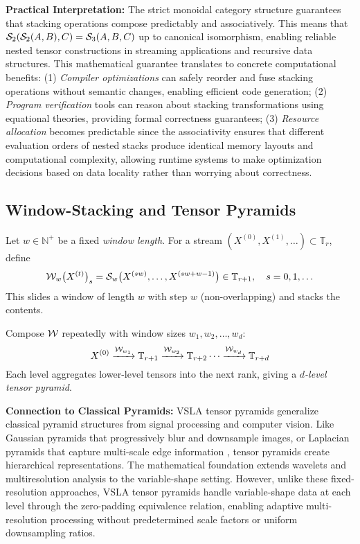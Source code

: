 \textbf{Practical Interpretation:} The strict monoidal category structure guarantees that stacking operations compose predictably and associatively. This means that $\mathcal{S}_2(\mathcal{S}_2(A,B),C) = \mathcal{S}_3(A,B,C)$ up to canonical isomorphism, enabling reliable nested tensor constructions in streaming applications and recursive data structures. This mathematical guarantee translates to concrete computational benefits: (1) \textit{Compiler optimizations} can safely reorder and fuse stacking operations without semantic changes, enabling efficient code generation; (2) \textit{Program verification} tools can reason about stacking transformations using equational theories, providing formal correctness guarantees; (3) \textit{Resource allocation} becomes predictable since the associativity ensures that different evaluation orders of nested stacks produce identical memory layouts and computational complexity, allowing runtime systems to make optimization decisions based on data locality rather than worrying about correctness.

\subsection{Window-Stacking and Tensor Pyramids}

\begin{definition}
Let $w \in \mathbb{N}^+$ be a fixed \emph{window length}. For a stream $(X^{(0)}, X^{(1)}, \ldots) \subset \mathbb{T}_r$, define
\[
\mathcal{W}_w\bigl(X^{(t)}\bigr)_s = \mathcal{S}_w\bigl(X^{(sw)}, \ldots, X^{(sw+w-1)}\bigr) \in \mathbb{T}_{r+1}, \quad s = 0, 1, \ldots
\]
This slides a window of length $w$ with step $w$ (non-overlapping) and stacks the contents.
\end{definition}

\begin{definition}
Compose $\mathcal{W}$ repeatedly with window sizes $w_1, w_2, \ldots, w_d$:
\[
X^{(0)} \xrightarrow{\mathcal{W}_{w_1}} \mathbb{T}_{r+1} \xrightarrow{\mathcal{W}_{w_2}} \mathbb{T}_{r+2} \cdots \xrightarrow{\mathcal{W}_{w_d}} \mathbb{T}_{r+d}
\]
Each level aggregates lower-level tensors into the next rank, giving a \emph{$d$-level tensor pyramid}.
\end{definition}

\textbf{Connection to Classical Pyramids:} VSLA tensor pyramids generalize classical pyramid structures from signal processing and computer vision. Like Gaussian pyramids that progressively blur and downsample images, or Laplacian pyramids that capture multi-scale edge information \cite{BurtAdelson1983}, tensor pyramids create hierarchical representations. The mathematical foundation extends wavelets and multiresolution analysis \cite{Mallat99} to the variable-shape setting. However, unlike these fixed-resolution approaches, VSLA tensor pyramids handle variable-shape data at each level through the zero-padding equivalence relation, enabling adaptive multi-resolution processing without predetermined scale factors or uniform downsampling ratios.

